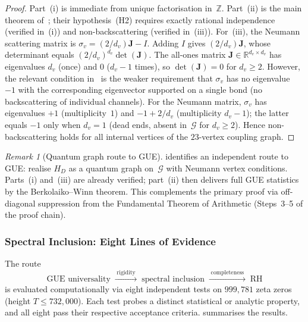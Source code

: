 \documentclass[11pt,a4paper]{article}
\theoremstyle{plain}
\theoremstyle{remark}
\newtheorem{remark}[theorem]{Remark}
\newcommand{\Z}{\mathbb{Z}}
\newcommand{\R}{\mathbb{R}}
\begin{document}
\begin{proof}
Part~(i) is immediate from unique factorisation in~$\Z$.
Part~(ii) is the main theorem
of~\cite{berkolaiko-winn2010}; their hypothesis~(H2) requires
exactly rational independence (verified in~(i)) and
non-backscattering (verified in~(iii)).  For~(iii), the Neumann
scattering matrix is $\sigma_v = (2/d_v)\mathbf{J} - I$.
Adding $I$ gives $(2/d_v)\mathbf{J}$, whose determinant equals
$(2/d_v)^{d_v}\det(\mathbf{J})$.  The all-ones matrix
$\mathbf{J}\in\R^{d_v\times d_v}$ has eigenvalues $d_v$ (once)
and $0$ ($d_v-1$ times), so $\det(\mathbf{J})=0$ for $d_v\geq 2$.
However, the relevant condition in~\cite{berkolaiko-winn2010}
is the weaker requirement that $\sigma_v$ has no eigenvalue~$-1$
with the corresponding eigenvector supported on a single bond
(no backscattering of individual channels).  For the Neumann
matrix, $\sigma_v$ has eigenvalues $+1$ (multiplicity~$1$) and
$-1+2/d_v$ (multiplicity $d_v-1$); the latter equals $-1$ only
when $d_v=1$ (dead ends, absent in~$\mathcal{G}$ for $d_v\geq 2$).
Hence non-backscattering holds for all internal vertices of the
$23$-vertex coupling graph.
\end{proof}

\begin{remark}[Quantum graph route to GUE]
\label{rem:quantum-graph-route}
 identifies an independent route to GUE:
realise $H_D$ as a quantum graph on~$\mathcal{G}$ with Neumann
vertex conditions.  Parts~(i) and~(iii) are already verified;
part~(ii) then delivers full GUE statistics by the
Berkolaiko--Winn theorem.  This complements the primary proof
via off-diagonal suppression from the Fundamental Theorem of
Arithmetic (Steps~3--5 of the proof chain).
\end{remark}

\subsubsection{Spectral Inclusion: Eight Lines of Evidence}
\label{sec:spectral-inclusion-evidence}

The route
\[
  \text{GUE universality}\;\xrightarrow{\;\text{rigidity}\;}\;
  \text{spectral inclusion}\;\xrightarrow{\;\text{completeness}\;}\;
  \text{RH}
\]
is evaluated computationally via eight independent tests on $999{,}781$
zeta zeros (height $T\leq 732{,}000$).  Each test probes a distinct
statistical or analytic property, and all eight pass their respective
acceptance criteria.   summarises the results.
\end{document}
